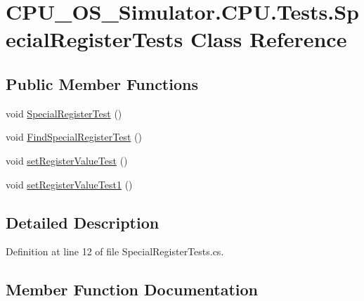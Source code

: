 \hypertarget{class_c_p_u___o_s___simulator_1_1_c_p_u_1_1_tests_1_1_special_register_tests}{}\section{C\+P\+U\+\_\+\+O\+S\+\_\+\+Simulator.\+C\+P\+U.\+Tests.\+Special\+Register\+Tests Class Reference}
\label{class_c_p_u___o_s___simulator_1_1_c_p_u_1_1_tests_1_1_special_register_tests}
\subsection*{Public Member Functions}
\begin{DoxyCompactItemize}
\item 
void \hyperlink{class_c_p_u___o_s___simulator_1_1_c_p_u_1_1_tests_1_1_special_register_tests_a1fb5b50362573ae62720d1c2b7e4a9ba}{Special\+Register\+Test} ()
\item 
void \hyperlink{class_c_p_u___o_s___simulator_1_1_c_p_u_1_1_tests_1_1_special_register_tests_a2897acd6a583aab1dd723b13c9f88e60}{Find\+Special\+Register\+Test} ()
\item 
void \hyperlink{class_c_p_u___o_s___simulator_1_1_c_p_u_1_1_tests_1_1_special_register_tests_a69f7c3f739036835145a8fadd7112d9e}{set\+Register\+Value\+Test} ()
\item 
void \hyperlink{class_c_p_u___o_s___simulator_1_1_c_p_u_1_1_tests_1_1_special_register_tests_a3c0a8e74b166d73fe40bbf4130917687}{set\+Register\+Value\+Test1} ()
\end{DoxyCompactItemize}


\subsection{Detailed Description}


Definition at line 12 of file Special\+Register\+Tests.\+cs.



\subsection{Member Function Documentation}
\hypertarget{class_c_p_u___o_s___simulator_1_1_c_p_u_1_1_tests_1_1_special_register_tests_a2897acd6a583aab1dd723b13c9f88e60}{}
